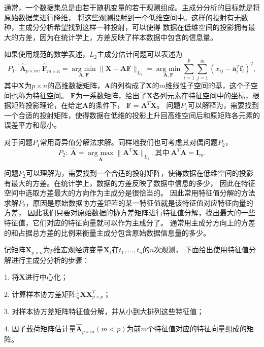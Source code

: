 通常，一个数据集总是由若干随机变量的若干观测组成。主成分分析的目标就是将原始数据集进行降维，
将这些观测投射到一个低维空间中。这样的投射有无数种，主成分分析希望找到这样一种投射，可以使得
数据在低维空间的投影拥有最大的方差，因为在统计学上，方差反映了样本数据中包含的信息量。

如果使用规范的数学表述，$L_2$主成分估计问题可以表述为
\begin{equation}\label{pca-l2-p1}
P_1: \ \hat{\bm{A}}_{p\times m}, \hat{\bm{F}}_{m\times n} = \underset{\bm{A},\bm{F}}{\operatorname{arg\ min} } 
\|\bm{X} - \bm{A}\bm{F}\|_{L_2}
 = \underset{\bm{A}, \bm{F}}{\operatorname{arg\ min}} \sum_{i=1}^p \sum_{j=1}^m (x_{ij} - \bm a_i^T\bm f_i)^2 ,
\end{equation}
其中$\bm{X}$为$p \times n$的高维数据矩阵，$\bm{A}$的列构成了$\bm{X}$的$m$维线性子空间的基，这个子空间也称为特征空间。
$\bm{F}$为一系数矩阵，给出了$\bm{X}$各列元素在特征空间中的坐标，根据矩阵投影理论，在给定$\bm{A}$的条件下，
$\bm{F} = \bm{A}^T \bm{X}$。
问题$P_1$可以解释为，需要找到一个合适的投射矩阵，使得数据在低维的投影上升回高维空间后和原矩阵各元素的误差平方和最小。

对于问题$P_1$常用奇异值分解法求解。同样地我们也可考虑其对偶问题$P_2$，
\begin{equation}\label{pca-l2-p2}
P_2: \ \hat{\bm{A}} = \underset{\bm{A}}{\operatorname{arg\ max}} \| \bm{A}^T \bm{X}\|_{L_2}, \text{其中}\ \bm{A}^T
\bm{A} = \bm{I}_m.
\end{equation}

问题$P_2$可以理解为，需要找到一个合适的投射矩阵，使得数据在低维空间的投影有最大的方差。在统计学上，数据的方差反映了数据中信息的多少，
因此在特征空间中选取方差最大的方向作为主成分是很恰当的。
因此常用特征值分解的方法求解$P_2$，原因是原始数据协方差矩阵的某一特征值就是该特征值对应特征向量的方差，
因此我们只要对原始数据的协方差矩阵进行特征值分解，找出最大的一些特征值，它们对应的特征向量就可以作为主成分了。
通常用主成分方向上的方差的和占据总方差的比例来衡量主成分包含原始数据信息量的多少。

记矩阵$\bm{X}_{p\times n}$为$p$维宏观经济变量$\bm{X}_t$在$t_1, ..., t_n$的$n$次观测，
下面给出使用特征值分解进行主成分分析的步骤：

1. 将$\bm{X}$进行中心化；

2. 计算样本协方差矩阵$\frac1{n}\bm{X}\bm{X}^T_{p\times p}$；

3. 对样本协方差矩阵特征值分解，并从小到大排列这些特征值；

4. 因子载荷矩阵估计量$\hat{\bm{A}}_{p\times m} (m < p)$为前$m$个特征值对应的特征向量组成的矩阵。

